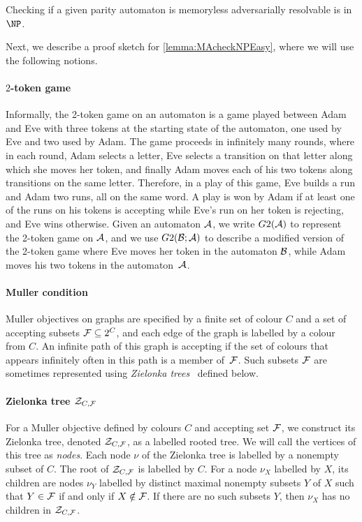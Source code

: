 \begin{lemma}\label{lemma:MAcheckNPEasy}
Checking if a given parity automaton is memoryless adversarially resolvable is in $\NP$.
\end{lemma}
Next, we describe a proof sketch for \cref{lemma:MAcheckNPEasy}, where we will use the following notions.

\paragraph*{$2$-token game} Informally, the 2-token game on an automaton is a game played between Adam and Eve with three tokens at the starting state of the automaton, one used by Eve and two used by Adam. The game proceeds in infinitely many rounds, where in each round, Adam selects a letter, Eve selects a transition on that letter along which she moves her token, and finally Adam moves each of his two tokens along transitions on the same letter. Therefore, in a play of this game, Eve builds a run and Adam two runs, all on the same word. A play is won by Adam if at least one of the runs on his tokens is accepting while Eve's run on her token is rejecting, and Eve wins otherwise. Given an automaton $\mathcal{A}$, we write $G2(\mathcal{A})$ to represent the 2-token game on $\mathcal{A}$, and we use $G2(\mathcal{B};\mathcal{A})$ to describe a modified version of the 2-token game where Eve moves her token in the automaton $\mathcal{B}$, while Adam moves his two tokens in the automaton~$\mathcal{A}$.


 \paragraph*{Muller condition} Muller objectives on graphs are specified by a finite set of colour $C$ and a set of accepting subsets $\mathcal{F}\subseteq 2^C$, and each edge of the graph is labelled by a colour from $C$. An infinite path of this graph is accepting if the set of colours that appears infinitely often in this path is a member of~$\mathcal{F}$. Such subsets $\mathcal{F}$ are sometimes represented using \emph{Zielonka trees}~\cite{DJW97}  defined below.

\paragraph*{Zielonka tree $\mathcal{Z}_{C,\mathcal{F}}$}
For a Muller objective defined by colours $C$ and accepting set $\mathcal{F}$, we construct its Zielonka tree, denoted $\mathcal{Z}_{C,\mathcal{F}}$, as a labelled rooted tree. We will call the vertices of this tree as \emph{nodes}. Each node $\nu$ of the Zielonka tree is labelled by a nonempty subset of $C$. 
The root of $\mathcal{Z}_{C,\mathcal{F}}$ is labelled by $C$. For a node $\nu_X$ labelled by $X$, its children are nodes $\nu_Y$ labelled by distinct maximal nonempty subsets $Y$ of $X$ such that $Y\in\mathcal{F}$ if and only if $X \notin \mathcal{F}$. If there are no such subsets $Y$, then $\nu_X$ has no children in $\mathcal{Z}_{C,\mathcal{F}}$.

